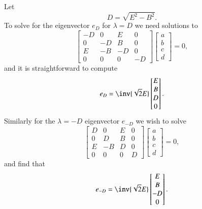 {Let
%
\begin{equation}\label{eqn:relElectroDynProblemSet2:570}
D = \sqrt{E^2 - B^2}.
\end{equation}
%
To solve for the eigenvector \(e_D\) for \(\lambda = D\) we need solutions to
%
\begin{equation}\label{eqn:relElectroDynProblemSet2:590}
\begin{bmatrix}
-D & 0 & E & 0 \\
0 & -D & B & 0 \\
E & -B & -D & 0 \\
0 & 0 & 0 & -D
\end{bmatrix}
\begin{bmatrix}
a \\
b \\
c \\
d
\end{bmatrix}
 = 0,
\end{equation}
%
and it is straightforward to compute
%
\begin{equation}\label{eqn:relElectroDynProblemSet2:610}
e_D =
\inv{\sqrt{2}E}
\begin{bmatrix}
E \\
B \\
D \\
0
\end{bmatrix}.
\end{equation}
%
Similarly for the \(\lambda = -D\) eigenvector \(e_{-D}\) we wish to solve
%
\begin{equation}\label{eqn:relElectroDynProblemSet2:630}
\begin{bmatrix}
D & 0 & E & 0 \\
0 & D & B & 0 \\
E & -B & D & 0 \\
0 & 0 & 0 & D
\end{bmatrix}
\begin{bmatrix}
a \\
b \\
c \\
d
\end{bmatrix}
 = 0,
\end{equation}
%
and find that
%
\begin{equation}\label{eqn:relElectroDynProblemSet2:650}
e_{-D} =
\inv{\sqrt{2}E}
\begin{bmatrix}
E \\
B \\
-D \\
0
\end{bmatrix}.
\end{equation}
}
